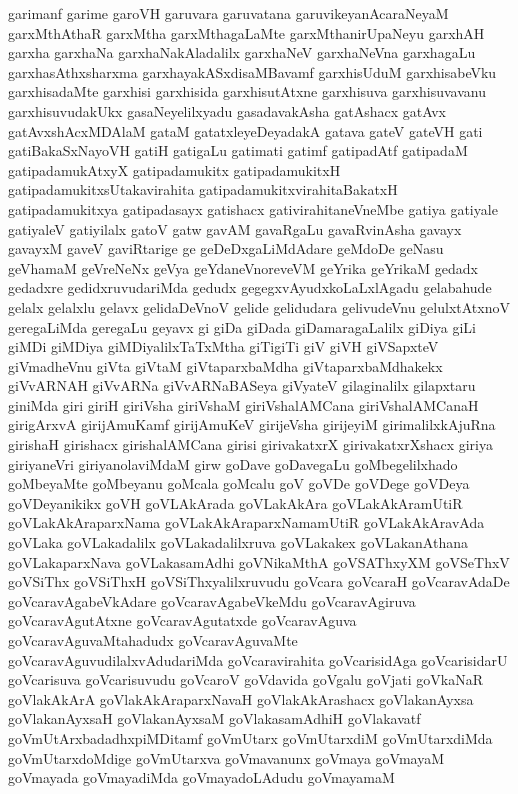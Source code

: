 {garimanf
garime
garoVH
garuvara
garuvatana
garuvikeyanAcaraNeyaM
garxMthAthaR
garxMtha
garxMthagaLaMte
garxMthanirUpaNeyu
garxhAH
garxha
garxhaNa
garxhaNakAladalilx
garxhaNeV
garxhaNeVna
garxhagaLu
garxhasAthxsharxma
garxhayakASxdisaMBavamf
garxhisUduM
garxhisabeVku
garxhisadaMte
garxhisi
garxhisida
garxhisutAtxne
garxhisuva
garxhisuvavanu
garxhisuvudakUkx
gasaNeyelilxyadu
gasadavakAsha
gatAshacx
gatAvx
gatAvxshAcxMDAlaM
gataM
gatatxleyeDeyadakA
gatava
gateV
gateVH
gati
gatiBakaSxNayoVH
gatiH
gatigaLu
gatimati
gatimf
gatipadAtf
gatipadaM
gatipadamukAtxyX
gatipadamukitx
gatipadamukitxH
gatipadamukitxsUtakavirahita
gatipadamukitxvirahitaBakatxH
gatipadamukitxya
gatipadasayx
gatishacx
gativirahitaneVneMbe
gatiya
gatiyale
gatiyaleV
gatiyilalx
gatoV
gatw
gavAM
gavaRgaLu
gavaRvinAsha
gavayx
gavayxM
gaveV
gaviRtarige
ge
geDeDxgaLiMdAdare
geMdoDe
geNasu
geVhamaM
geVreNeNx
geVya
geYdaneVnoreveVM
geYrika
geYrikaM
gedadx
gedadxre
gedidxruvudariMda
gedudx
gegegxvAyudxkoLaLxlAgadu
gelabahude
gelalx
gelalxlu
gelavx
gelidaDeVnoV
gelide
gelidudara
gelivudeVnu
gelulxtAtxnoV
geregaLiMda
geregaLu
geyavx
gi
giDa
giDada
giDamaragaLalilx
giDiya
giLi
giMDi
giMDiya
giMDiyalilxTaTxMtha
giTigiTi
giV
giVH
giVSapxteV
giVmadheVnu
giVta
giVtaM
giVtaparxbaMdha
giVtaparxbaMdhakekx
giVvARNAH
giVvARNa
giVvARNaBASeya
giVyateV
gilaginalilx
gilapxtaru
giniMda
giri
giriH
giriVsha
giriVshaM
giriVshalAMCana
giriVshalAMCanaH
girigArxvA
girijAmuKamf
girijAmuKeV
girijeVsha
girijeyiM
girimalilxkAjuRna
girishaH
girishacx
girishalAMCana
girisi
girivakatxrX
girivakatxrXshacx
giriya
giriyaneVri
giriyanolaviMdaM
girw
goDave
goDavegaLu
goMbegelilxhado
goMbeyaMte
goMbeyanu
goMcala
goMcalu
goV
goVDe
goVDege
goVDeya
goVDeyanikikx
goVH
goVLAkArada
goVLakAkAra
goVLakAkAramUtiR
goVLakAkAraparxNama
goVLakAkAraparxNamamUtiR
goVLakAkAravAda
goVLaka
goVLakadalilx
goVLakadalilxruva
goVLakakex
goVLakanAthana
goVLakaparxNava
goVLakasamAdhi
goVNikaMthA
goVSAThxyXM
goVSeThxV
goVSiThx
goVSiThxH
goVSiThxyalilxruvudu
goVcara
goVcaraH
goVcaravAdaDe
goVcaravAgabeVkAdare
goVcaravAgabeVkeMdu
goVcaravAgiruva
goVcaravAgutAtxne
goVcaravAgutatxde
goVcaravAguva
goVcaravAguvaMtahadudx
goVcaravAguvaMte
goVcaravAguvudilalxvAdudariMda
goVcaravirahita
goVcarisidAga
goVcarisidarU
goVcarisuva
goVcarisuvudu
goVcaroV
goVdavida
goVgalu
goVjati
goVkaNaR
goVlakAkArA
goVlakAkAraparxNavaH
goVlakAkArashacx
goVlakanAyxsa
goVlakanAyxsaH
goVlakanAyxsaM
goVlakasamAdhiH
goVlakavatf
goVmUtArxbadadhxpiMDitamf
goVmUtarx
goVmUtarxdiM
goVmUtarxdiMda
goVmUtarxdoMdige
goVmUtarxva
goVmavanunx
goVmaya
goVmayaM
goVmayada
goVmayadiMda
goVmayadoLAdudu
goVmayamaM
}
